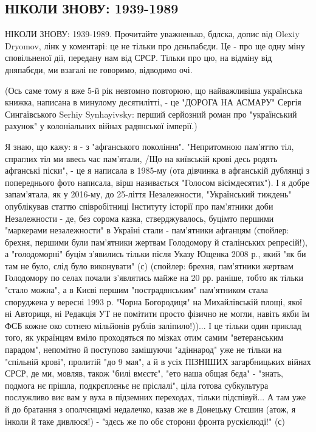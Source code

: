  
 
 
 
 
\subsection{НІКОЛИ ЗНОВУ: 1939-1989}

НІКОЛИ ЗНОВУ: 1939-1989. Прочитайте уважненько, бдлска, допис від Olexiy
Dryomov, лінк у коментарі: це не тільки про дєньпабєди. Це - про ще одну міну
сповільненої дії, передану нам від СРСР. Тільки про цю, на відміну від
дняпабєди, ми взагалі не говоримо, відводимо очі.

(Ось саме тому я вже 5-й рік невтомно повторюю, що найважливіша українська
книжка, написана в минулому десятилітті, - це "ДОРОГА НА АСМАРУ" Сергія
Сингаївського Serhiy Synhayivsky: перший серйозний роман про "український
рахунок" у колоніальних війнах радянської імперії.)

Я знаю, що кажу: я - з "афганського покоління". "Непритомною пам'яттю тіл,
спраглих тіл ми ввесь час пам'ятали, /Що на київській крові десь родять
афганські піски", - це я написала в 1985-му (ота дівчинка в афганській дублянці
з попереднього фото написала, вірш називається "Голосом вісімдесятих"). І я
добре запам'ятала, як у 2016-му, до 25-ліття Незалежности, "Український
тиждень" опублікував статтю співробітниці Інституту історії про пам'ятники доби
Незалежности - де, без сорома казка, стверджувалось, буцімто першими "маркерами
незалежности" в Україні стали - пам'ятники афганцям (спойлер: брехня, першими
були пам'ятники жертвам Голодомору й сталінських репресій!), а "голодоморні"
буцім з'явились тільки після Указу Ющенка 2008 р., який "як би там не було,
слід було виконувати" (с) (спойлер: брехня, пам'ятники жертвам Голодомору по
селах почали з'являтись майже на 20 рр. раніше, тобто як тільки "стало можна",
а в Києві першим "пострадянським" пам'ятником стала споруджена у вересні 1993
р. "Чорна Богородиця" на Михайлівській площі, якої ні Авториця, ні Редакція УТ
не помітити просто фізично не могли, навіть якби їм ФСБ кожне око сотнею
мільйонів рублів заліпило!))... І це тільки один приклад того, як українцям
вміло проходяться по мізках отим самим "ветеранським парадом", непомітно й
поступово замішуючи "адіннарод" уже не тільки на "спільній крові", пролитій "до
9 мая", а й в усіх ПІЗНІШИХ загарбницьких війнах СРСР, де ми, мовляв, також
"билі вмєстє", "ето наша общая бєда" - "знать, подмога нє прішла, подкрєплєньє
нє пріслалі", ціла готова субкультура послужливо виє вам у вуха в підземних
переходах, тільки підспівуй... А там уже й до братання з ополчєнцамі недалечко,
казав же в Донецьку Стєшин (атож, я інколи й таке дивлюся!) - "здєсь же по обє
сторони фронта рускієлюді!" (с)

